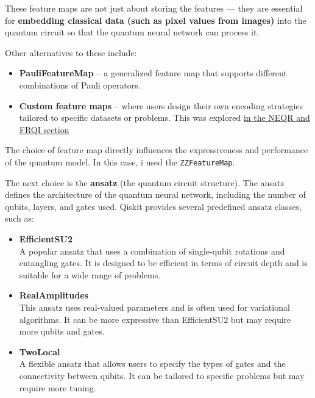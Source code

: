 \documentclass[conference]{IEEEtran}
\begin{document}
\begin{itemize}
        These feature maps are not just about storing the features — they are essential for \textbf{embedding classical data (such as pixel values from images)} into the quantum circuit so that the quantum neural network can process it.
        
        Other alternatives to these include:
        \begin{itemize}
            \item \textbf{PauliFeatureMap \cite{qiskit_paulifeaturemap}} – a generalized feature map that supports different combinations of Pauli operators.
            \item \textbf{Custom feature maps} – where users design their own encoding strategies tailored to specific datasets or problems. This was explored \hyperref[sec:NEQR_FRQI]{in the NEQR and FRQI section}
        \end{itemize}
        
        The choice of feature map directly influences the expressiveness and performance of the quantum model. In this case, i used the \texttt{ZZFeatureMap}.


        The next choice is the \textbf{ansatz} (the quantum circuit structure). The ansatz defines the architecture of the quantum neural network, including the number of qubits, layers, and gates used. Qiskit provides several predefined ansatz classes, such as:
        \begin{itemize}
            \item \textbf{EfficientSU2 \cite{qiskit_efficientsu2}} \\
            A popular ansatz that uses a combination of single-qubit rotations and entangling gates. It is designed to be efficient in terms of circuit depth and is suitable for a wide range of problems.
        
            \item \textbf{RealAmplitudes \cite{qiskit_realamplitudes}} \\
            This ansatz uses real-valued parameters and is often used for variational algorithms. It can be more expressive than EfficientSU2 but may require more qubits and gates.
        
            \item \textbf{TwoLocal \cite{qiskit_twolocal}} \\
            A flexible ansatz that allows users to specify the types of gates and the connectivity between qubits. It can be tailored to specific problems but may require more tuning.


\end{itemize}
\end{itemize}
\end{document}
